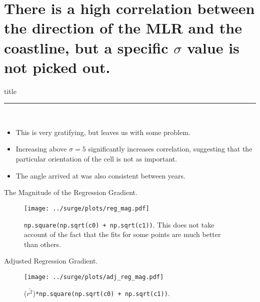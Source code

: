 \section{There is a high correlation between the direction of the MLR and the
 coastline, but a specific $\sigma$ value is not picked out. }
    \begin{frame}[plain]
        \vfill
      \centering
      \begin{beamercolorbox}[sep=8pt,center,shadow=true,rounded=true]{title}
        \insertsectionhead\par%
        \color{oxfordblue}\noindent\rule{10cm}{1pt} \\
        \begin{itemize}
        \item This is very gratifying, but leaves us with some problem.
        \item Increasing above $\sigma=5$ significantly increases correlation,
         suggesting that the particular orientation of the cell is not as important.
        \item The angle arrived at was also consistent between years.
        \end{itemize}
      \end{beamercolorbox}
      \vfill
  \end{frame}

\begin{frame}{The Magnitude of the  Regression Gradient.}
\vspace{-30pt}
\hspace{-30pt}
 \begin{minipage}{1.1\textwidth}
\begin{figure}[htb!]
    \centering
   \hspace{-40pt} \texttt{[image: ../surge/plots/reg\_mag.pdf]}
    \vspace{-15pt}
   \caption{\texttt{np.square(np.sqrt(c0) + np.sqrt(c1))}.
    This does not take account of the fact that the fits for some points are much better than others.}
    \label{fig:A}
\end{figure}
\end{minipage}
\end{frame}

\begin{frame}{Adjusted Regression Gradient.}
\vspace{-30pt}
\hspace{-30pt}
 \begin{minipage}{1.1\textwidth}
\begin{figure}[htb!]
    \centering
   \hspace{-40pt} \texttt{[image: ../surge/plots/adj\_reg\_mag.pdf]}
    \vspace{-15pt}
   \caption{($\bar{r^2}$)\texttt{*np.square(np.sqrt(c0) + np.sqrt(c1))}. }
    \label{fig:A}
\end{figure}
\end{minipage}
\end{frame}


